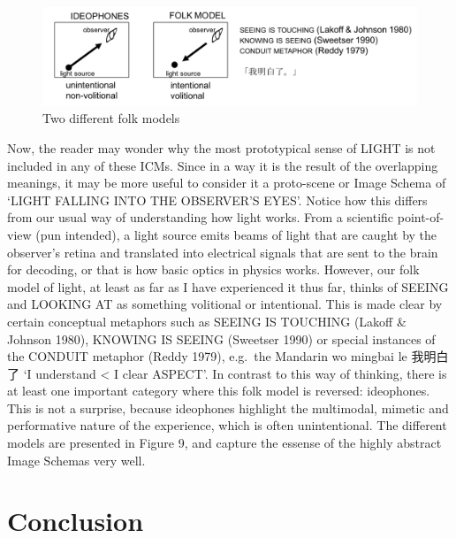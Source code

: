 \begin{figure}
\includegraphics[width=22.43in]{ideos/folkmodel} \caption{Two different folk models}\label{fig:folk}
\end{figure}

Now, the reader may wonder why the most prototypical sense of LIGHT is
not included in any of these ICMs. Since in a way it is the result of
the overlapping meanings, it may be more useful to consider it a
proto-scene or Image Schema of `LIGHT FALLING INTO THE OBSERVER'S EYES'.
Notice how this differs from our usual way of understanding how light
works. From a scientific point-of-view (pun intended), a light source
emits beams of light that are caught by the observer's retina and
translated into electrical signals that are sent to the brain for
decoding, or that is how basic optics in physics works. However, our
folk model of light, at least as far as I have experienced it thus far,
thinks of SEEING and LOOKING AT as something volitional or intentional.
This is made clear by certain conceptual metaphors such as SEEING IS
TOUCHING (Lakoff \& Johnson 1980), KNOWING IS SEEING (Sweetser 1990) or
special instances of the CONDUIT metaphor (Reddy 1979), e.g.~the
Mandarin wo mingbai le 我明白了 `I understand \textless{} I clear
ASPECT'. In contrast to this way of thinking, there is at least one
important category where this folk model is reversed: ideophones. This
is not a surprise, because ideophones highlight the multimodal, mimetic
and performative nature of the experience, which is often unintentional.
The different models are presented in Figure 9, and capture the essense
of the highly abstract Image Schemas very well.

\section{Conclusion}\label{conclusion}


